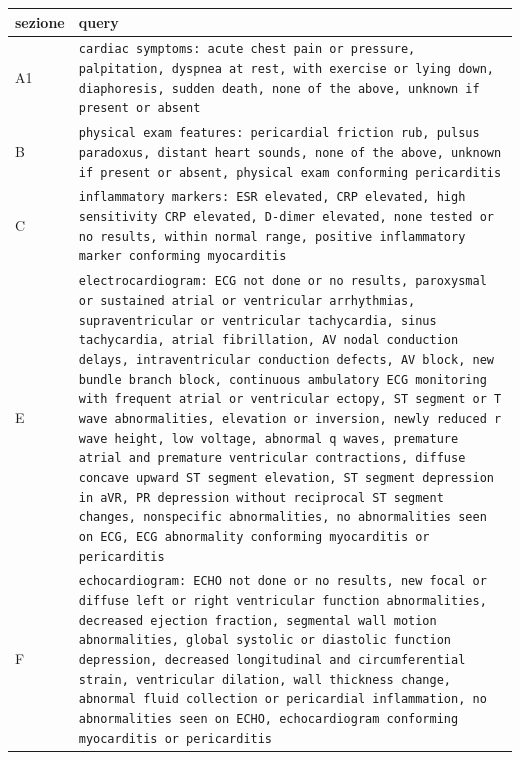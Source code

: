 \begin{tabular}{l p{9cm}}
\toprule
sezione & query \\
\midrule
A1 & \texttt{cardiac symptoms: acute chest pain or pressure, palpitation, dyspnea at rest, with exercise or lying down, diaphoresis, sudden death, none of the above, unknown if present or absent} \\
B & \texttt{physical exam features: pericardial friction rub, pulsus paradoxus, distant heart sounds, none of the above, unknown if present or absent, physical exam conforming pericarditis} \\
C & \texttt{inflammatory markers: ESR elevated, CRP elevated, high sensitivity CRP elevated, D-dimer elevated, none tested or no results, within normal range, positive inflammatory marker conforming myocarditis} \\
E & \texttt{electrocardiogram: ECG not done or no results, paroxysmal or sustained atrial or ventricular arrhythmias, supraventricular or ventricular tachycardia, sinus tachycardia, atrial fibrillation, AV nodal conduction delays, intraventricular conduction defects, AV block, new bundle branch block, continuous ambulatory ECG monitoring with frequent atrial or ventricular ectopy, ST segment or T wave abnormalities, elevation or inversion, newly reduced r wave height, low voltage, abnormal q waves, premature atrial and premature ventricular contractions, diffuse concave upward ST segment elevation, ST segment depression in aVR, PR depression without reciprocal ST segment changes, nonspecific abnormalities, no abnormalities seen on ECG, ECG abnormality conforming myocarditis or pericarditis} \\
F & \texttt{echocardiogram: ECHO not done or no results, new focal or diffuse left or right ventricular function abnormalities, decreased ejection fraction, segmental wall motion abnormalities, global systolic or diastolic function depression, decreased longitudinal and circumferential strain, ventricular dilation, wall thickness change, abnormal fluid collection or pericardial inflammation, no abnormalities seen on ECHO, echocardiogram conforming myocarditis or pericarditis} \\
\bottomrule
\end{tabular}
